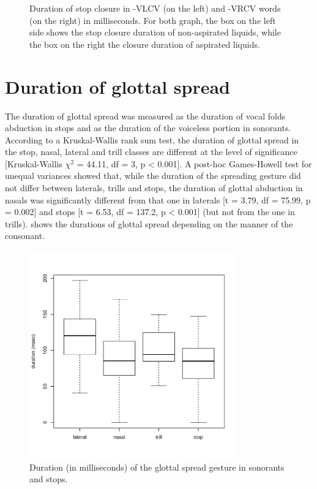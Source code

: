 \documentclass[11pt,a4paper,oneside,openany]{memoir}\usepackage[]{graphicx}\usepackage[]{color}
\newenvironment{knitrout}{}{} %
\begin{document}
\begin{figure}
\begin{subfigure}{.5\textwidth}
\begin{knitrout}
\end{knitrout}
\end{subfigure}
\caption{Duration of stop closure in -VLCV (on the left) and -VRCV words (on the right) in milliseconds.
For both graph, the box on the left side shows the stop closure duration of non-aspirated liquids, while the box on the right the closure duration of aspirated liquids.
}
\label{f:diclos}
\end{figure}


\section{Duration of glottal spread}
\label{s:gs}


The duration of glottal spread was measured as the duration of vocal folds abduction in stops and as the duration of the voiceless portion in sonorants.
According to a Kruskal-Wallis rank sum test, the duration of glottal spread in the stop, nasal, lateral and trill classes are different at the level of significance [Kruskal-Wallis $\chi^2$ = 44.11, df = 3, p < 0.001].
A post-hoc Games-Howell test for unequal variances showed that, while the duration of the spreading gesture did not differ between laterals, trills and stops, the duration of glottal abduction in nasals was significantly different from that one in laterals [t = 3.79, df = 75.99, p = 0.002] and stops [t = 6.53, df = 137.2, p < 0.001] (but not from the one in trills).
 shows the durations of glottal spread depending on the manner of the consonant.

\begin{figure}
\centering
\begin{knitrout}
\color{fgcolor}
\includegraphics[width=0.8\textwidth]{img/gs-box-1} 

\end{knitrout}
\caption{Duration (in milliseconds) of the glottal spread gesture in sonorants and stops.}
\label{f:spread-box}
\end{figure}
\end{document}
